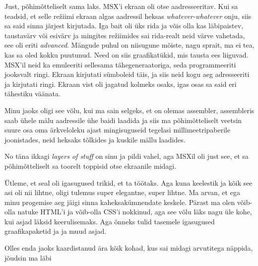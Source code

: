 Just, põhimõtteliselt sama laks. MSX'i ekraan oli otse aadresseeritav. Kui sa 
teadsid, et selle režiimi ekraan algas aadressil heksas 
\emph{whatever-whatever} onju, siis sa said sinna järjest kirjutada. Iga bait 
oli üks rida ja võis olla kas läbipaistev, taustavärv või esivärv ja mingites 
režiimides sai rida-realt neid värve vahetada, see oli eriti \emph{advanced}. 
Mängude puhul on niisugune mõiste, nagu sprait, ma ei tea, kas sa oled kokku 
puutunud. Need on siis graafikatükid, mis tausta ees liiguvad. MSX'il neid ka 
emuleeriti sellesama tähegeneraatoriga, seda programmeeriti jooksvalt ringi. 
Ekraan kirjutati sümboleid täis, ja siis neid kogu aeg adresseeriti ja 
kirjutati ringi. Ekraan vist oli jagatud kolmeks osaks, igas osas sa said eri 
tähestiku väänata.

Minu jaoks oligi see võlu, kui ma sain selgeks, et on olemas 
assembler, assembleris saab ühele mälu aadressile ühe 
baidi laadida ja siis ma põhimõtteliselt veetsin suure osa oma ärkveloleku 
ajast mingisuguseid tegelasi  millimeetripaberile joonistades, neid heksaks 
tõlkides ja kuskile mällu laadides. 


No täna ikkagi \emph{layers of stuff} on sinu ja pildi vahel, aga MSXil oli 
just see, et sa põhimõtteliselt sa toorelt toppisid otse ekraanile midagi. 


Ütleme, et seal oli igasugused trikid, et ta töötaks. Aga kuna keelestik ja 
kõik see asi oli nii lihtne, oligi tulemus super elegantne, super  lihtne.  Ma 
arvan, et ega minu progemise aeg jäigi sinna kaheksakümnendate keskele. Pärast 
ma olen võib-olla natuke HTML'i ja võib-olla CSS'i nokkinud, aga see võlu läks 
nagu üle kohe, kui asjad läksid keerulisemaks. Aga õnneks tulid tasemele 
igasugused graafikapaketid ja ja muud asjad. 


Olles enda jaoks kaardistanud ära kõik kohad, kus sai midagi arvutitega 
näppida, jõudsin ma läbi

